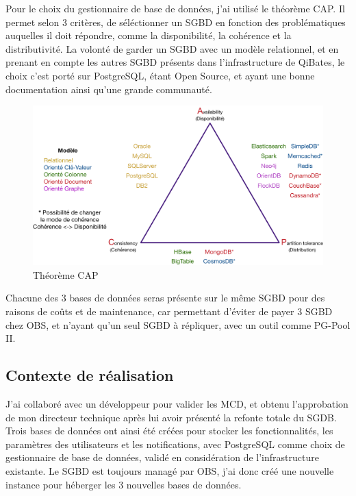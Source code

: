 \documentclass[a4paper, 11pt]{report}
\begin{document}
  Pour le choix du gestionnaire de base de données, j'ai utilisé le théorème CAP.
  Il permet selon 3 critères, de séléctionner un SGBD en fonction des problématiques auquelles il doit répondre, comme la disponibilité, la cohérence et la distributivité.
  La volonté de garder un SGBD avec un modèle relationnel, et en prenant en compte les autres SGBD présents dans l'infrastructure de QiBates, le choix c'est porté sur PostgreSQL, étant Open Source, et ayant une bonne documentation ainsi qu'une grande communauté.
  \begin{figure}[H]
      \centering
      \includegraphics[scale=0.25,center]{schemas/cap-theoreme.png}
      \caption{Théorème CAP}
  \end{figure}
  \newline
  Chacune des 3 bases de données seras présente sur le même SGBD pour des raisons de coûts et de maintenance, car permettant d'éviter de payer 3 SGBD chez OBS, et n'ayant qu'un seul SGBD à répliquer, avec un outil comme PG-Pool II.
\subsection{Contexte de réalisation}
J'ai collaboré avec un développeur pour valider les MCD, et obtenu l'approbation de mon directeur technique après lui avoir présenté la refonte totale du SGDB.
Trois bases de données ont ainsi été créées pour stocker les fonctionnalités, les paramètres des utilisateurs et les notifications, avec PostgreSQL comme choix de gestionnaire de base de données, validé en considération de l'infrastructure existante.
Le SGBD est toujours managé par OBS, j'ai donc créé une nouvelle instance pour héberger les 3 nouvelles bases de données.
\end{document}
